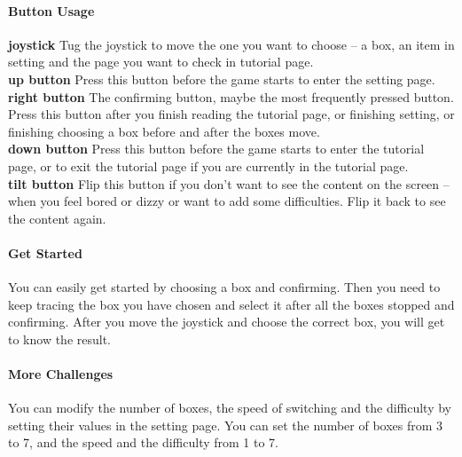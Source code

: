\paragraph{Button Usage}
\hfill \newline
\textbf{joystick} Tug the joystick to move the one you want to choose -- a box, an item in setting and the page you want to check in tutorial page.\\
\textbf{up button} Press this button before the game starts to enter the setting page.\\
\textbf{right button} The confirming button, maybe the most frequently pressed button. Press this button after you finish reading the tutorial page, or finishing setting, or finishing choosing a box before and after the boxes move.\\
\textbf{down button} Press this button before the game starts to enter the tutorial page, or to exit the tutorial page if you are currently in the tutorial page.\\
\textbf{tilt button} Flip this button if you don't want to see the content on the screen -- when you feel bored or dizzy or want to add some difficulties. Flip it back to see the content again.

\paragraph{Get Started}
\hfill \newline
You can easily get started by choosing a box and confirming. Then you need to keep tracing the box you have chosen and select it after all the boxes stopped and confirming. After you move the joystick and choose the correct box, you will get to know the result.

\paragraph{More Challenges}
\hfill \newline
You can modify the number of boxes, the speed of switching and the difficulty by setting their values in the setting page. You can set the number of boxes from 3 to 7, and the speed and the difficulty from 1 to 7.